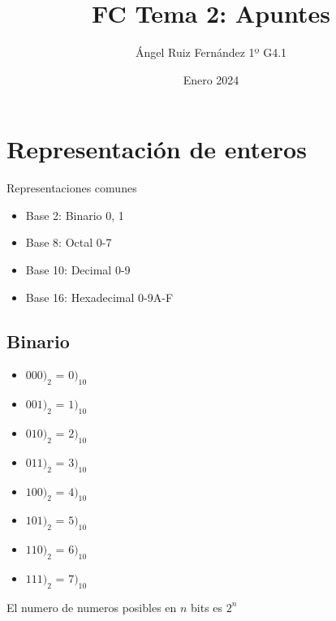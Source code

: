 \documentclass[12pt, letterpaper, twoside]{article}
\title{FC Tema 2: Apuntes}
\author{Ángel Ruiz Fernández 1º G4.1}
\date{Enero 2024}
\begin{document}
	\maketitle
	
	\section{Representación de enteros}
	Representaciones comunes
	\begin{itemize}
		\item Base 2: Binario {0, 1}
		\item Base 8: Octal {0-7}
		\item Base 10: Decimal {0-9}
		\item Base 16: Hexadecimal {0-9A-F}
	\end{itemize}

	\subsection{Binario}
	\begin{itemize}
		\item $000)_2$ = $0)_{10}$
		\item $001)_2$ = $1)_{10}$
		\item $010)_2$ = $2)_{10}$
		\item $011)_2$ = $3)_{10}$
		\item $100)_2$ = $4)_{10}$
		\item $101)_2$ = $5)_{10}$
		\item $110)_2$ = $6)_{10}$
		\item $111)_2$ = $7)_{10}$
	\end{itemize}
	
	El numero de numeros posibles en $n$ bits es $2^n$
	
	
	
\end{document}
